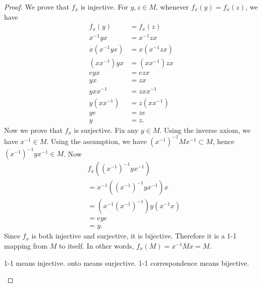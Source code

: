 \begin{enumerate}[resume]
\begin{proof}
	We prove that $f_x$ is injective. For $y, z \in M$, whenever $f_x(y) = f_x(z)$, we have
	\begin{align*}
		f_x(y) &= f_x(z) \\
		x^{-1} yx &= x^{-1} zx\\
		x(x^{-1} yx)&= x(x^{-1} zx) \\
		(x x^{-1} )yx &= (x x^{-1} )zx \\
		eyx&= ezx \\
		yx &= zx \\
		yx x^{-1} &= zx x^{-1}  \\
		y(x x^{-1}) &= z (x x^{-1} ) \\
		ye &= ze \\
		y &= z
	.\end{align*}
Now we prove that $f_x$ is surjective. Fix any $y \in M$. Using the inverse axiom, we have $x^{-1}  \in M$. Using the assumption, we have $\left( x^{-1}  \right) ^{-1} M x^{-1} \subset M$, hence $\left( x^{-1}  \right) ^{-1} y x^{-1} \in  M$. Now
\begin{align*}
	&f_x\left(\left( x^{-1}  \right) ^{-1} y x^{-1}\right) \\
	&= x^{-1} \left(\left( x^{-1}  \right) ^{-1} y x^{-1}\right) x \\
	&= \left(x^{-1} \left( x^{-1} \right)  ^{-1} \right)y \left(x^{-1}x\right)  \\
	&= eye \\
	&= y
.\end{align*}
Since $f_x$ is both injective and surjective, it is bijective. Therefore it is a 1-1 mapping from $M$ to itself. In other words, $f_x(M) = x^{-1} Mx = M$.
\begin{correction}
	1-1 means injective. onto means surjective. 1-1 correspondence means bijective.
\end{correction}
\end{proof}

\end{enumerate}

